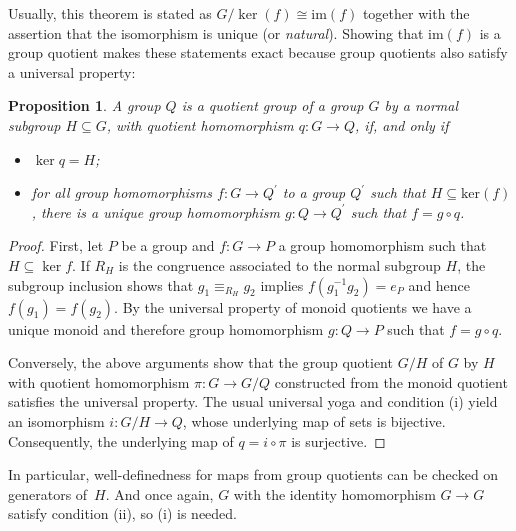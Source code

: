\documentclass{amsart}
\theoremstyle{plain}
\numberwithin{equation}{section} %
\numberwithin{figure}{section} %
\theoremstyle{plain}
\theoremstyle{plain}
\theoremstyle{plain}
\theoremstyle{plain}
\theoremstyle{plain}
\newtheorem{prop}[thm]{Proposition} %
\theoremstyle{plain}
\theoremstyle{remark}
\theoremstyle{remark}
\theoremstyle{remark}
\begin{document}
Usually, this theorem is stated as $G/\ker(f) \cong \mathrm{im}(f)$ together with the assertion that the isomorphism is unique (or \textit{natural}). Showing that $\mathrm{im}(f)$ is a group quotient makes these statements exact because group quotients also satisfy a universal property:
\begin{prop}  %
A group $Q$ is a quotient group of a group $G$ by a normal subgroup $H \subseteq G$, with quotient homomorphism $q : G \rightarrow Q$, if, and only if
\begin{itemize}
\item[(i)] $\ker q = H$;
\item[(ii)] for all group homomorphisms $f : G \rightarrow Q^\prime$ to a group $Q^\prime$ such that $H \subseteq \mathrm{ker}(f)$, there is a unique group homomorphism $g : Q \rightarrow Q^\prime$ such that $f = g \circ q$.
\end{itemize}
\end{prop}
\begin{proof}
First, let $P$ be a group and $f : G \rightarrow P$ a group homomorphism such that $H \subseteq \ker f$. If $R_H$ is the congruence associated to the normal subgroup $H$, the subgroup inclusion shows that $g_1 \equiv_{R_H} g_2$ implies $f(g_1^{-1}g_2) = e_P$ and hence $f(g_1) = f(g_2)$. By the universal property of monoid quotients we have a unique monoid and therefore group homomorphism $g : Q \rightarrow P$ such that $f = g \circ q$.

Conversely, the above arguments show that the group quotient $G/H$ of $G$ by $H$ with quotient homomorphism $\pi : G \rightarrow G/Q$ constructed from the monoid quotient satisfies the universal property. The usual universal yoga and condition (i) yield an isomorphism $i : G/H \rightarrow Q$, whose underlying map of sets is bijective. Consequently, the underlying map of $q = i \circ \pi$ is surjective. 
\end{proof}

In particular, well-definedness for maps from group quotients can be checked on generators of~$H$. And once again, $G$ with the identity homomorphism $G \rightarrow G$ satisfy condition (ii), so (i) is needed.
\end{document}
